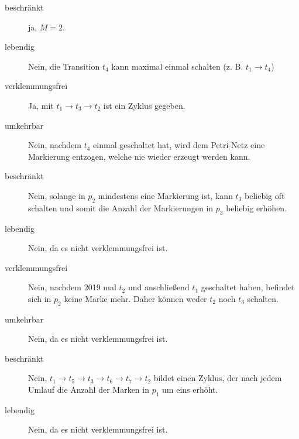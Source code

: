 \documentclass{lehramt-informatik-haupt}
\begin{document}
\begin{antwort}


\tikzset{/petri/.cd,x=2,y=2,scale=0.45}

\noindent
{}
%
%
%

\begin{description}
\item[beschränkt] ja, $M = 2$.

\item[lebendig] Nein, die Transition $t_4$ kann maximal einmal schalten
(z. B. $t_1 \rightarrow t_4$)

\item[verklemmungsfrei] Ja, mit $t_1 \rightarrow t_3 \rightarrow  t_2$
ist ein Zyklus gegeben.

\item[umkehrbar] Nein, nachdem $t_4$ einmal geschaltet hat, wird dem
Petri-Netz eine Markierung entzogen, welche nie wieder erzeugt werden
kann.
\end{description}


\begin{description}
\item[beschränkt] Nein, solange in $p_2$ mindestens eine Markierung ist,
kann $t_3$ beliebig oft schalten und somit die Anzahl der Markierungen
in $p_3$ beliebig erhöhen.

\item[lebendig] Nein, da es nicht verklemmungsfrei ist.

\item[verklemmungsfrei] Nein, nachdem 2019 mal $t_2$ und anschließend
$t_1$ geschaltet haben, befindet sich in $p_2$ keine Marke mehr. Daher
können weder $t_2$ noch $t_3$ schalten.

\item[umkehrbar]
Nein, da es nicht verklemmungsfrei ist.
\end{description}


\begin{description}
\item[beschränkt] Nein, $t_1 \rightarrow t_5 \rightarrow t_3 \rightarrow
t_6 \rightarrow t_7 \rightarrow t_2$ bildet einen Zyklus, der nach jedem
Umlauf die Anzahl der Marken in $p_1$ um eins erhöht.

\item[lebendig] Nein, da es nicht verklemmungsfrei ist.


\end{description}
\end{antwort}
\end{document}
